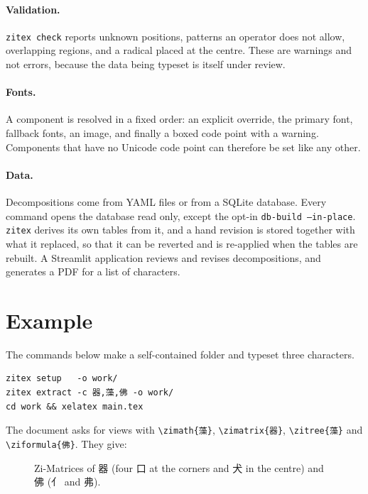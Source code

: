 \documentclass[11pt]{article}
\newcommand{\cmd}[1]{\texttt{\textbackslash #1}}
\begin{document}
\paragraph{Validation.} \texttt{zitex check} reports unknown positions, patterns an operator does not allow, overlapping regions, and a radical placed
at the centre. These are warnings and not errors, because the data being typeset is itself under review.

\paragraph{Fonts.} A component is resolved in a fixed order: an explicit override, the primary font, fallback fonts, an image, and finally a boxed code point
with a warning. Components that have no Unicode code point can therefore be set like any other.

\paragraph{Data.} Decompositions come from YAML files or from a SQLite database. Every command opens the database read only, except the opt-in \texttt{db-build --in-place}. \texttt{zitex} derives its own tables from it, and
a hand revision is stored together with what it replaced, so that it can be reverted and is re-applied when the tables are rebuilt.
A Streamlit application reviews and revises decompositions, and generates a PDF for a list of characters.

\section{Example}\label{sec:example}
The commands below make a self-contained folder and typeset three characters.

\begin{verbatim}
zitex setup   -o work/
zitex extract -c 器,藻,佛 -o work/
cd work && xelatex main.tex
\end{verbatim}

The document asks for views with \cmd{zimath}\texttt{\{藻\}}, \cmd{zimatrix}\texttt{\{器\}}, \cmd{zitree}\texttt{\{藻\}}
and \cmd{ziformula}\texttt{\{佛\}}. They give:


\begin{figure}[ht]
\centering
{}\qquad{}
\caption{Zi-Matrices of 器 (four 口 at the corners and 犬 in the centre) and 佛 (亻 and 弗).}
\label{fig:matrix}
\end{figure}
\end{document}
